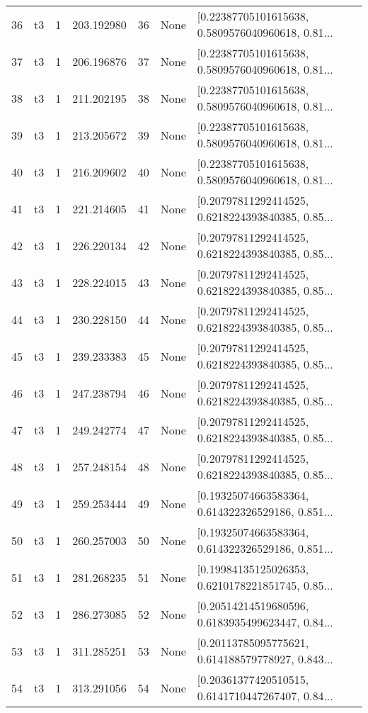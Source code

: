 \begin{tabular}{lllrlll}
36  &  t3 &   1 &  203.192980 &   36 &  None &  [0.22387705101615638, 0.5809576040960618, 0.81... \\
37  &  t3 &   1 &  206.196876 &   37 &  None &  [0.22387705101615638, 0.5809576040960618, 0.81... \\
38  &  t3 &   1 &  211.202195 &   38 &  None &  [0.22387705101615638, 0.5809576040960618, 0.81... \\
39  &  t3 &   1 &  213.205672 &   39 &  None &  [0.22387705101615638, 0.5809576040960618, 0.81... \\
40  &  t3 &   1 &  216.209602 &   40 &  None &  [0.22387705101615638, 0.5809576040960618, 0.81... \\
41  &  t3 &   1 &  221.214605 &   41 &  None &  [0.20797811292414525, 0.6218224393840385, 0.85... \\
42  &  t3 &   1 &  226.220134 &   42 &  None &  [0.20797811292414525, 0.6218224393840385, 0.85... \\
43  &  t3 &   1 &  228.224015 &   43 &  None &  [0.20797811292414525, 0.6218224393840385, 0.85... \\
44  &  t3 &   1 &  230.228150 &   44 &  None &  [0.20797811292414525, 0.6218224393840385, 0.85... \\
45  &  t3 &   1 &  239.233383 &   45 &  None &  [0.20797811292414525, 0.6218224393840385, 0.85... \\
46  &  t3 &   1 &  247.238794 &   46 &  None &  [0.20797811292414525, 0.6218224393840385, 0.85... \\
47  &  t3 &   1 &  249.242774 &   47 &  None &  [0.20797811292414525, 0.6218224393840385, 0.85... \\
48  &  t3 &   1 &  257.248154 &   48 &  None &  [0.20797811292414525, 0.6218224393840385, 0.85... \\
49  &  t3 &   1 &  259.253444 &   49 &  None &  [0.19325074663583364, 0.614322326529186, 0.851... \\
50  &  t3 &   1 &  260.257003 &   50 &  None &  [0.19325074663583364, 0.614322326529186, 0.851... \\
51  &  t3 &   1 &  281.268235 &   51 &  None &  [0.19984135125026353, 0.6210178221851745, 0.85... \\
52  &  t3 &   1 &  286.273085 &   52 &  None &  [0.20514214519680596, 0.6183935499623447, 0.84... \\
53  &  t3 &   1 &  311.285251 &   53 &  None &  [0.20113785095775621, 0.614188579778927, 0.843... \\
54  &  t3 &   1 &  313.291056 &   54 &  None &  [0.20361377420510515, 0.6141710447267407, 0.84... \\

\end{tabular}
